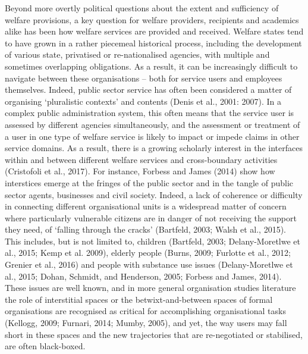 Beyond more overtly political questions about the extent and sufficiency of welfare provisions, a key question for welfare providers, recipients and academics alike has been how welfare services are  provided and received. Welfare states tend to have grown in a rather piecemeal historical process, including the development of various state, privatised or re-nationalised agencies, with multiple and sometimes overlapping obligations. As a result, it can be increasingly difficult to navigate between these organisations – both for service users and employees themselves. Indeed, public sector service has often been considered a matter of organising ‘pluralistic contexts’ and contents (Denis et al., 2001: 2007). In a complex public administration system, this often means that the service user is assessed by different agencies simultaneously, and the assessment or treatment of a user in one type of welfare service is likely to impact or impede claims in other service domains.   As a result, there is a growing scholarly interest in the interfaces within and between different welfare services and cross-boundary activities (Cristofoli et al., 2017). For instance, Forbess and James (2014) show how interstices emerge at the fringes of the public sector and in the tangle of public sector agents, businesses and civil society. Indeed, a lack of coherence or difficulty in connecting different organisational units is a widespread matter of concern where particularly vulnerable citizens are in danger of not receiving the support they need, of ‘falling through the cracks’ (Bartfeld, 2003; Walsh et al., 2015). This includes, but is not limited to, children (Bartfeld, 2003; Delany-Moretlwe et al., 2015; Kemp et al. 2009), elderly people (Burns, 2009; Furlotte et al., 2012; Grenier et al., 2016) and people with substance use issues (Delany-Moretlwe et al., 2015; Dohan, Schmidt, and Henderson, 2005; Forbess and James, 2014). These issues are well known, and in more general organisation studies literature the role of interstitial spaces or the betwixt-and-between spaces of formal organisations are recognised as critical for accomplishing organisational tasks (Kellogg, 2009; Furnari, 2014; Mumby, 2005), and yet, the way users may  fall short in these spaces and the new trajectories that are re-negotiated or stabilised, are often black-boxed. \par
